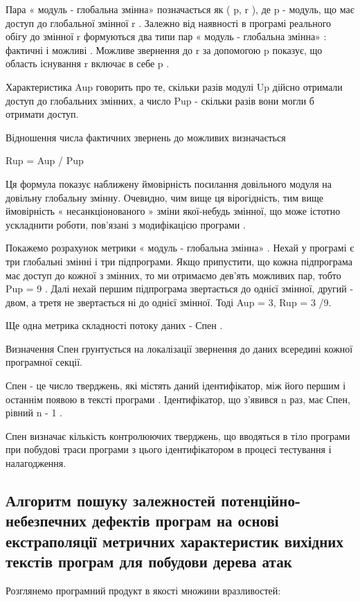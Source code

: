 Пара « модуль - глобальна змінна» позначається як ( p, r ), де p - модуль, що має доступ до глобальної змінної r . Залежно від наявності в програмі реального обігу до змінної r формуються два типи пар « модуль - глобальна змінна» : фактичні і можливі . Можливе звернення до r за допомогою p показує, що область існування r включає в себе p .

Характеристика Aup говорить про те, скільки разів модулі Up дійсно отримали доступ до глобальних змінних, а число Pup - скільки разів вони могли б отримати доступ.

Відношення числа фактичних звернень до можливих визначається

Rup = Aup / Pup

Ця формула показує наближену ймовірність посилання довільного модуля на довільну глобальну змінну. Очевидно, чим вище ця вірогідність, тим вище ймовірність « несанкціонованого » зміни якої-небудь змінної, що може істотно ускладнити роботи, пов'язані з модифікацією програми .

Покажемо розрахунок метрики « модуль - глобальна змінна» . Нехай у програмі є три глобальні змінні і три підпрограми. Якщо припустити, що кожна підпрограма має доступ до кожної з змінних, то ми отримаємо дев'ять можливих пар, тобто Pup = 9 . Далі нехай першим підпрограма звертається до однієї змінної, другий - двом, а третя не звертається ні до однієї змінної. Тоді Aup = 3, Rup = 3 /9.

Ще одна метрика складності потоку даних - Спен .

Визначення Спен грунтується на локалізації звернення до даних всередині кожної програмної секції.

Спен - це число тверджень, які містять даний ідентифікатор, між його першим і останнім появою в тексті програми . Ідентифікатор, що з'явився n раз, має Спен, рівний n - 1 .

Спен визначає кількість контролюючих тверджень, що вводяться в тіло програми при побудові траси програми з цього ідентифікатором в процесі тестування і налагодження.


\subsection{Алгоритм пошуку залежностей потенційно-небезпечних дефектів програм на основі екстраполяції метричних характеристик вихідних текстів програм для побудови дерева атак}
\label{2section:id13}
Розглянемо програмний продукт в якості множини вразливостей:

